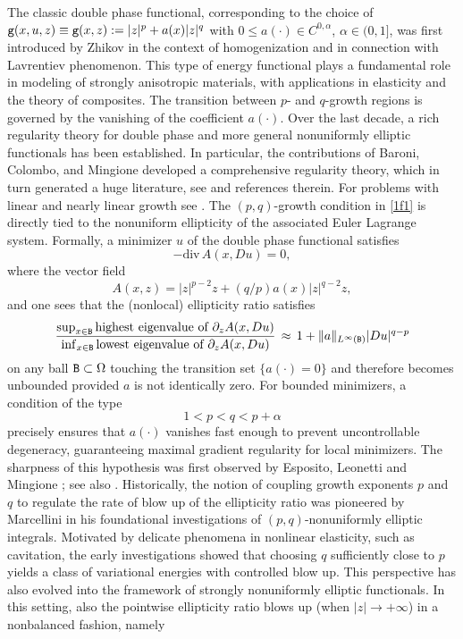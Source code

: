 \documentclass[a4paper]{amsart}
\theoremstyle{plain}  %
\numberwithin{equation}{section}
\newcommand{\nr}[1]{\lVert #1 \rVert}
\newcommand{\tx}[1]{\textnormal{\texttt{#1}}}
\begin{document}
The classic double phase functional, corresponding to the choice of $\tx{g}(x,u,z) \equiv \tx{g}(x,z):= |z|^p + a(x)|z|^q$ with $0 \leq a(\cdot) \in C^{0,\alpha} $, $\alpha \in (0,1]$, was first introduced by Zhikov \cite{Z1, Z0} in the context of homogenization and in connection with Lavrentiev phenomenon. This type of energy functional plays a fundamental role in modeling of strongly anisotropic materials, with applications in elasticity and the theory of composites. 
The transition between \(p\)- and \(q\)-growth regions is governed by the vanishing of the coefficient \(a(\cdot)\). Over the last decade, a rich regularity theory for double phase and more general nonuniformly elliptic functionals has been established. In particular, the contributions of Baroni, Colombo, and Mingione \cite{BCM, comi2, comicz, comi1} developed a comprehensive regularity theory, which in turn generated a huge literature, see \cite{bb901,cjmpa, DLMM, G5, HO1,HO2,HO3,MNP,N,NC,jss} and references therein. For problems with linear and nearly linear growth see \cite{BG, BS, FPS, G1, G2, G3, G4}. The $(p,q)$-growth condition in \eqref{1f1} is directly tied to the nonuniform ellipticity of the associated Euler Lagrange system. Formally, a minimizer \(u\) of the double phase functional satisfies
\begin{equation}\label{el}
-\mathrm{div}\,A(x,Du) = 0,
\end{equation}
where the vector field 
\begin{equation*}
    A(x,z) = |z|^{p-2}z + (q/p) a(x)|z|^{q-2}z,
\end{equation*}
 and one sees that the (nonlocal) ellipticity ratio satisfies 
\begin{equation}\label{ratio}
\displaystyle \frac{\sup_{x\in \tx{B}} \text{highest eigenvalue of }\partial_z A(x, Du)} {\inf_{x\in \tx{B}} \text{lowest eigenvalue of }\partial_z A(x, Du)}\,\approx\, 1 + \nr{a}_{L^{\infty}(\tx{B})} |Du|^{q-p}
\end{equation}
on any ball $\tx{B} \subset \Omega$ touching the transition set \(\{ a(\cdot)=0\}\) and therefore becomes unbounded provided $a$ is not identically zero. For bounded minimizers, a condition of the type
\begin{equation*}
 1 < p < q < p + \alpha
\end{equation*}
precisely ensures that \(a(\cdot)\) vanishes fast enough to prevent uncontrollable degeneracy, guaranteeing maximal gradient regularity for local minimizers. The sharpness of this hypothesis was first observed by Esposito, Leonetti and  Mingione \cite{ELM}; see also \cite{balci2, balci4, ELM, FMM}. Historically, the notion of coupling growth exponents \(p\) and \(q\) to regulate the rate of blow up of the ellipticity ratio was pioneered by Marcellini \cite{ma2, ma4, ma1, ma5} in his foundational investigations of \((p,q)\)-nonuniformly elliptic integrals. Motivated by delicate phenomena in nonlinear elasticity, such as cavitation, the early investigations showed that choosing \( q \) sufficiently close to \( p \) yields a class of variational energies with controlled blow up. This perspective has also evolved into the framework of strongly nonuniformly elliptic functionals. In this setting, also the pointwise ellipticity ratio blows up (when $|z| \to +\infty$) in a nonbalanced fashion, namely
\end{document}
